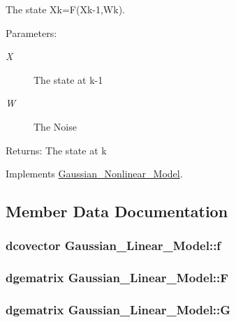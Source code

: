 The state Xk=F(Xk-1,Wk). 

\begin{Desc}
\item[Parameters:]
\begin{description}
\item[{\em X}]The state at k-1 \item[{\em W}]The Noise\end{description}
\end{Desc}
\begin{Desc}
\item[Returns:]The state at k \end{Desc}


Implements \hyperlink{class_gaussian___nonlinear___model_df0e6cf50a8d5fdb6decd05046867cd8}{Gaussian\_\-Nonlinear\_\-Model}.

\subsection{Member Data Documentation}
\hypertarget{class_gaussian___linear___model_397ff0f1b4258b548fe87b27af41fd64}{
\subsubsection[{f}]{\setlength{\rightskip}{0pt plus 5cm}dcovector {\bf Gaussian\_\-Linear\_\-Model::f}}}
\label{class_gaussian___linear___model_397ff0f1b4258b548fe87b27af41fd64}


\hypertarget{class_gaussian___linear___model_b0b82054668f84d9144f14023adbe43a}{
\subsubsection[{F}]{\setlength{\rightskip}{0pt plus 5cm}dgematrix {\bf Gaussian\_\-Linear\_\-Model::F}}}
\label{class_gaussian___linear___model_b0b82054668f84d9144f14023adbe43a}


\hypertarget{class_gaussian___linear___model_4d198f5e8f711cefb5de857b0cf28e6c}{
\subsubsection[{G}]{\setlength{\rightskip}{0pt plus 5cm}dgematrix {\bf Gaussian\_\-Linear\_\-Model::G}}}
\label{class_gaussian___linear___model_4d198f5e8f711cefb5de857b0cf28e6c}


